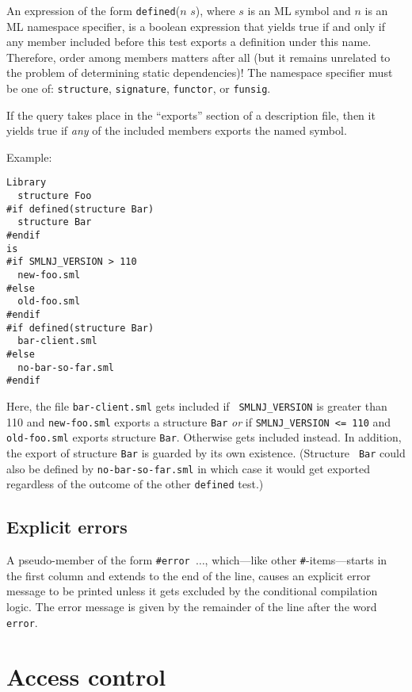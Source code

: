 \documentclass[titlepage,letterpaper]{article}
\begin{document}
An expression of the form {\tt defined}($n$ $s$), where $s$ is an ML
symbol and $n$ is an ML namespace specifier, is a boolean expression
that yields true if and only if any member included before this test
exports a definition under this name.  Therefore, order among members
matters after all (but it remains unrelated to the problem of
determining static dependencies)!  The namespace specifier must be one
of: {\tt structure}, {\tt signature}, {\tt functor}, or {\tt funsig}.

If the query takes place in the ``exports'' section of a description
file, then it yields true if {\em any} of the included members exports
the named symbol.

\noindent Example:

\begin{verbatim}
Library
  structure Foo
#if defined(structure Bar)
  structure Bar
#endif
is
#if SMLNJ_VERSION > 110
  new-foo.sml
#else
  old-foo.sml
#endif
#if defined(structure Bar)
  bar-client.sml
#else
  no-bar-so-far.sml
#endif
\end{verbatim}

Here, the file {\tt bar-client.sml} gets included if {\tt
SMLNJ\_VERSION} is greater than 110 and {\tt new-foo.sml} exports a
structure {\tt Bar} {\em or} if {\tt SMLNJ\_VERSION <= 110} and {\tt
old-foo.sml} exports structure {\tt Bar}.  Otherwise gets included instead.  In addition, the export of
structure {\tt Bar} is guarded by its own existence.  (Structure {\tt
Bar} could also be defined by {\tt no-bar-so-far.sml} in
which case it would get exported regardless of the outcome of the
other {\tt defined} test.)

\subsection{Explicit errors}

A pseudo-member of the form {\tt \#error $\ldots$}, which---like other
{\tt \#}-items---starts in the first column and extends to the end of
the line, causes an explicit error message to be printed unless it
gets excluded by the conditional compilation logic.  The error message
is given by the remainder of the line after the word {\tt error}.

\section{Access control}
\label{sec:access}
\end{document}
